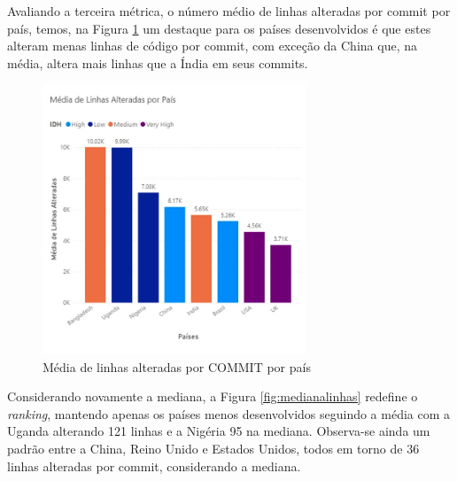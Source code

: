 \documentclass[12pt]{article}
\begin{document}
Avaliando a terceira métrica, o número médio de linhas alteradas por commit por país, temos, na Figura \ref{fig:media_linhas} um destaque para os países desenvolvidos é que estes alteram menas linhas de código por commit, com exceção da China que, na média, altera mais linhas que a Índia em seus commits.

\begin{figure}[H]
\centering
\includegraphics[width=0.7\textwidth]{img/rq3/media linhas.png}
\caption{Média de linhas alteradas por COMMIT por país}
\label{fig:media_linhas}
\end{figure}

Considerando novamente a mediana, a Figura \ref{fig:medianalinhas} redefine o \textit{ranking},  mantendo apenas os países menos desenvolvidos seguindo a média com a Uganda alterando 121 linhas e a Nigéria 95 na mediana. Observa-se ainda um padrão entre a China, Reino Unido e Estados Unidos, todos em torno de 36 linhas alteradas por commit, considerando a mediana.
\end{document}
